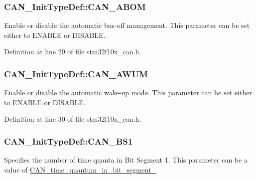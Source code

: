 \subsubsection[{\texorpdfstring{C\+A\+N\+\_\+\+A\+B\+OM}{CAN_ABOM}}]{ C\+A\+N\+\_\+\+Init\+Type\+Def\+::\+C\+A\+N\+\_\+\+A\+B\+OM}\hypertarget{struct_c_a_n___init_type_def_a70560646c27d96ca8adc4a62d24dafd9}{}\label{struct_c_a_n___init_type_def_a70560646c27d96ca8adc4a62d24dafd9}
Enable or disable the automatic bus-\/off management. This parameter can be set either to E\+N\+A\+B\+LE or D\+I\+S\+A\+B\+LE. 

Definition at line 29 of file stm32f10x\+\_\+can.\+h.

\subsubsection[{\texorpdfstring{C\+A\+N\+\_\+\+A\+W\+UM}{CAN_AWUM}}]{ C\+A\+N\+\_\+\+Init\+Type\+Def\+::\+C\+A\+N\+\_\+\+A\+W\+UM}\hypertarget{struct_c_a_n___init_type_def_a10f873c858a7b0efc2d0ab41524320d3}{}\label{struct_c_a_n___init_type_def_a10f873c858a7b0efc2d0ab41524320d3}
Enable or disable the automatic wake-\/up mode. This parameter can be set either to E\+N\+A\+B\+LE or D\+I\+S\+A\+B\+LE. 

Definition at line 30 of file stm32f10x\+\_\+can.\+h.

\subsubsection[{\texorpdfstring{C\+A\+N\+\_\+\+B\+S1}{CAN_BS1}}]{ C\+A\+N\+\_\+\+Init\+Type\+Def\+::\+C\+A\+N\+\_\+\+B\+S1}\hypertarget{struct_c_a_n___init_type_def_aac04e12079df3ecd4fdbc5a77793bc2d}{}\label{struct_c_a_n___init_type_def_aac04e12079df3ecd4fdbc5a77793bc2d}
Specifies the number of time quanta in Bit Segment 1. This parameter can be a value of \hyperlink{group___c_a_n__time__quantum__in__bit__segment__1}{C\+A\+N\+\_\+time\+\_\+quantum\+\_\+in\+\_\+bit\+\_\+segment\+\_} 

